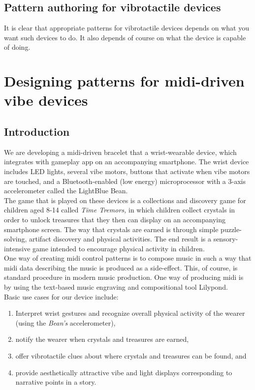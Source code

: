 \documentclass[a4paper, twocolumn]{article}
\begin{document}
\subsection{Pattern authoring for vibrotactile devices}
It is clear that appropriate patterns for vibrotactile devices depends on what you want such devices to do. It also depends of course on what the device is capable of doing. 

\section{Designing patterns for midi-driven vibe devices}

\subsection{Introduction}
We are developing a midi-driven bracelet that a wrist-wearable device, which integrates with gameplay app on an accompanying smartphone. The wrist device includes LED lights, several vibe motors, buttons that activate when vibe motors are touched, and a Bluetooth-enabled (low energy) microprocessor with a 3-axis accelerometer called the LightBlue Bean.\\

The game that is played on these devices is a collections and discovery game for children aged 8-14 called \textit{Time Tremors,} in which children collect crystals in order to unlock treasures that they then can display on an accompanying smartphone screen. The way that crystals are earned is through simple puzzle-solving, artifact discovery and physical activities. The end result is a sensory-intensive game intended to encourage physical activity in children.\\

One way of creating midi control patterns is to compose music in such a way that midi data describing the music is produced as a side-effect. This, of course, is standard procedure in modern music production. One way of producing midi is by using the text-based music engraving and compositional tool Lilypond.\\

Basic use cases for our device include:
\begin{enumerate}
  \item Interpret wrist gestures and recognize overall physical activity of the wearer (using the \textit{Bean's} accelerometer),
  \item notify the wearer when crystals and treasures are earned,
  \item offer vibrotactile clues about where crystals and treasures can be found, and
  \item provide aesthetically attractive vibe and light displays corresponding to narrative points in a story.\\
\end{enumerate}
\end{document}
